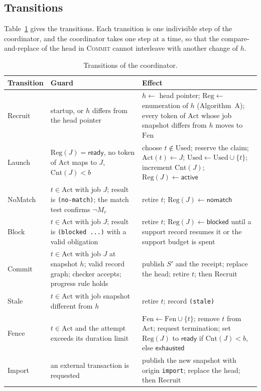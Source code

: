 \documentclass[11pt,a4paper]{article}
\theoremstyle{plain}
\theoremstyle{definition}
\theoremstyle{remark}
\theoremstyle{definition}
\newcommand{\code}[1]{\texttt{#1}}
\begin{document}
\subsection{Transitions}

Table~\ref{tab:transitions} gives the transitions. Each transition is one indivisible step of the coordinator, and the coordinator takes one step at a time, so that the compare-and-replace of the head in \textsc{Commit} cannot interleave with another change of $h$.

\begin{table}[t]
\centering\small
\renewcommand{\arraystretch}{1.2}
\begin{tabular}{@{}p{2.0cm}p{5.4cm}p{6.0cm}@{}}
\toprule
Transition & Guard & Effect \\
\midrule
Recruit & startup, or $h$ differs from the head pointer & $h \gets$ head pointer; $\mathrm{Reg} \gets$ enumeration of $h$ (Algorithm~A); every token of $\mathrm{Act}$ whose job snapshot differs from $h$ moves to $\mathrm{Fen}$ \\
Launch & $\mathrm{Reg}(J) = \mathsf{ready}$, no token of $\mathrm{Act}$ maps to $J$, $\mathrm{Cnt}(J) < b$ & choose $t \notin \mathrm{Used}$; reserve the claim; $\mathrm{Act}(t) \gets J$; $\mathrm{Used} \gets \mathrm{Used} \cup \{t\}$; increment $\mathrm{Cnt}(J)$; $\mathrm{Reg}(J) \gets \mathsf{active}$ \\
NoMatch & $t \in \mathrm{Act}$ with job $J$; result is \code{(no-match)}; the match test confirms $\neg M_r$ & retire $t$; $\mathrm{Reg}(J) \gets \mathsf{nomatch}$ \\
Block & $t \in \mathrm{Act}$ with job $J$; result is \code{(blocked ...)} with a valid obligation & retire $t$; $\mathrm{Reg}(J) \gets \mathsf{blocked}$ until a support record resumes it or the support budget is spent \\
Commit & $t \in \mathrm{Act}$ with job $J$ at snapshot $h$; valid record graph; checker accepts; progress rule holds & publish $S'$ and the receipt; replace the head; retire $t$; then Recruit \\
Stale & $t \in \mathrm{Act}$ with job snapshot different from $h$ & retire $t$; record \code{(stale)} \\
Fence & $t \in \mathrm{Act}$ and the attempt exceeds its duration limit & $\mathrm{Fen} \gets \mathrm{Fen} \cup \{t\}$; remove $t$ from $\mathrm{Act}$; request termination; set $\mathrm{Reg}(J)$ to $\mathsf{ready}$ if $\mathrm{Cnt}(J) < b$, else $\mathsf{exhausted}$ \\
Import & an external transaction is requested & publish the new snapshot with origin \code{import}; replace the head; then Recruit \\
\bottomrule
\end{tabular}
\caption{Transitions of the coordinator.}
\label{tab:transitions}
\end{table}
\end{document}
